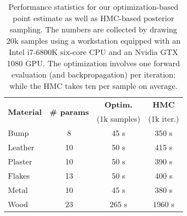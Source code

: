 \begin{table}[t]
	\centering
	\caption{\label{fig:performance}
		Performance statistics for our optimization-based point estimate as well as HMC-based posterior sampling.
		The numbers are collected by drawing 20k samples using a workstation equipped with an Intel i7-6800K six-core CPU and an Nvidia GTX 1080 GPU. 
		The optimization involves one forward evaluation (and backpropagation) per iteration; while the HMC takes ten per sample on average\protect\footnotemark.
	}
	\begin{tabular}{l|c|c|c}
		\multirow{2}{*}{\bf Material} & \multirow{2}{*}{\bf \# params} & {\bf Optim.} & {\bf HMC}\\
		& &  (1k samples) & (1k iter.)\\
		\hline
		Bump    & 8 & 45 s   & 350 s\\
		Leather & 10 & 50 s  & 415 s\\
		Plaster & 10 & 50 s  & 390 s\\
		Flakes  & 13 & 50 s  & 400 s\\
		Metal   & 10 & 45 s  & 380 s\\
		Wood   & 23 & 265 s & 1960 s
	\end{tabular}
\end{table}

